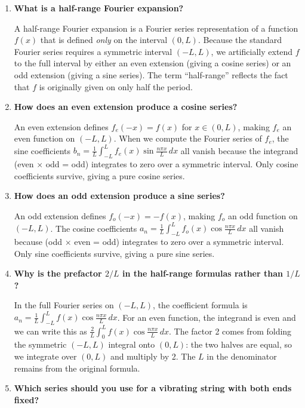 \documentclass[12pt,a4paper]{article}
\begin{document}
\begin{enumerate}[leftmargin=*, label=\textbf{Q\arabic*.}]

\item \textbf{What is a half-range Fourier expansion?}

A half-range Fourier expansion is a Fourier series representation of a function $f(x)$ that is defined \emph{only} on the interval $(0,L)$. Because the standard Fourier series requires a symmetric interval $(-L,L)$, we artificially extend $f$ to the full interval by either an even extension (giving a cosine series) or an odd extension (giving a sine series). The term ``half-range'' reflects the fact that $f$ is originally given on only half the period.

\item \textbf{How does an even extension produce a cosine series?}

An even extension defines $f_e(-x) = f(x)$ for $x \in (0,L)$, making $f_e$ an even function on $(-L,L)$. When we compute the Fourier series of $f_e$, the sine coefficients $b_n = \frac{1}{L}\int_{-L}^{L} f_e(x)\sin\frac{n\pi x}{L}\,dx$ all vanish because the integrand (even $\times$ odd = odd) integrates to zero over a symmetric interval. Only cosine coefficients survive, giving a pure cosine series.

\item \textbf{How does an odd extension produce a sine series?}

An odd extension defines $f_o(-x) = -f(x)$, making $f_o$ an odd function on $(-L,L)$. The cosine coefficients $a_n = \frac{1}{L}\int_{-L}^{L} f_o(x)\cos\frac{n\pi x}{L}\,dx$ all vanish because (odd $\times$ even = odd) integrates to zero over a symmetric interval. Only sine coefficients survive, giving a pure sine series.

\item \textbf{Why is the prefactor $2/L$ in the half-range formulas rather than $1/L$?}

In the full Fourier series on $(-L,L)$, the coefficient formula is $a_n = \frac{1}{L}\int_{-L}^{L}f(x)\cos\frac{n\pi x}{L}\,dx$. For an even function, the integrand is even and we can write this as $\frac{2}{L}\int_0^L f(x)\cos\frac{n\pi x}{L}\,dx$. The factor 2 comes from folding the symmetric $(-L,L)$ integral onto $(0,L)$: the two halves are equal, so we integrate over $(0,L)$ and multiply by 2. The $L$ in the denominator remains from the original formula.

\item \textbf{Which series should you use for a vibrating string with both ends fixed?}


\end{enumerate}
\end{document}
